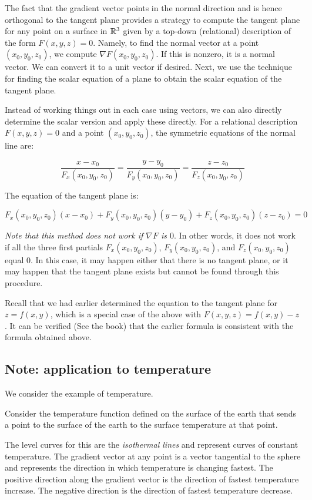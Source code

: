 \documentclass[10pt]{amsart}
\begin{document}
The fact that the gradient vector points in the normal direction and
is hence orthogonal to the tangent plane provides a strategy to
compute the tangent plane for any point on a surface in $\mathbb{R}^3$ given
by a top-down (relational) description of the form $F(x,y,z) =
0$. Namely, to find the normal vector at a point $(x_0,y_0,z_0)$, we
compute $\nabla F (x_0,y_0,z_0)$. If this is nonzero, it is a normal
vector. We can convert it to a unit vector if desired. Next, we use
the technique for finding the scalar equation of a plane to obtain the
scalar equation of the tangent plane.

Instead of working things out in each case using vectors, we can also
directly determine the scalar version and apply these directly. For a
relational description $F(x,y,z) = 0$ and a point $(x_0,y_0,z_0)$, the
symmetric equations of the normal line are:

$$\frac{x - x_0}{F_x(x_0,y_0,z_0)} = \frac{y - y_0}{F_y(x_0,y_0,z_0)} = \frac{z - z_0}{F_z(x_0,y_0,z_0)}$$

The equation of the tangent plane is:

$$F_x(x_0,y_0,z_0)(x - x_0) + F_y(x_0,y_0,z_0)(y - y_0) + F_z(x_0,y_0,z_0)(z - z_0) = 0$$

{\em Note that this method does not work if $\nabla F$ is $0$}. In
other words, it does not work if all the three first partials
$F_x(x_0,y_0,z_0)$, $F_y(x_0,y_0,z_0)$, and $F_z(x_0,y_0,z_0)$ equal
$0$. In this case, it may happen either that there is no tangent
plane, or it may happen that the tangent plane exists but cannot be
found through this procedure.

Recall that we had earlier determined the equation to the tangent
plane for $z = f(x,y)$, which is a special case of the above with
$F(x,y,z) = f(x,y) - z$. It can be verified (See the book) that the
earlier formula is consistent with the formula obtained above.

\subsection*{Note: application to temperature}

We consider the example of temperature.

Consider the temperature function defined on the surface of the earth
that sends a point to the surface of the earth to the surface
temperature at that point.

The level curves for this are the {\em isothermal lines} and represent
curves of constant temperature. The gradient vector at any point is a
vector tangential to the sphere and represents the direction in which
temperature is changing fastest. The positive direction along the
gradient vector is the direction of fastest temperature increase. The
negative direction is the direction of fastest temperature decrease.
\end{document}
